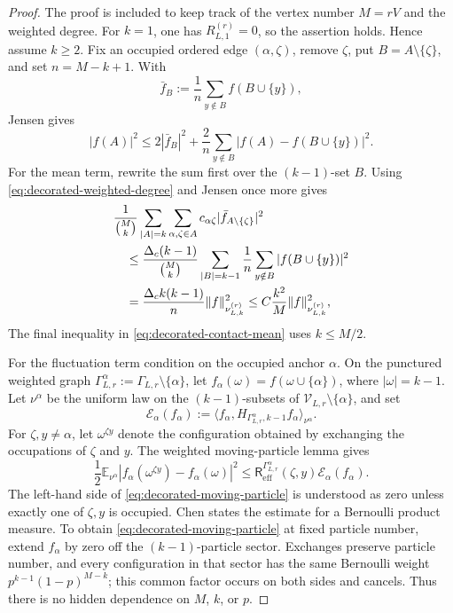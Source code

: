 \documentclass[11pt]{article}
\numberwithin{equation}{section}
\theoremstyle{remark}
\newcommand{\1}{\mathbf 1}
\begin{document}
\begin{proof}
The proof is included to keep track of the vertex number \(M=rV\) and the
weighted degree.  For \(k=1\), one has \(R_{L,1}^{(r)}=0\), so the assertion
holds.  Hence assume \(k\geq2\).  Fix an occupied ordered edge
\((\alpha,\zeta)\), remove
\(\zeta\), put \(B=A\setminus\{\zeta\}\), and set
\(n=M-k+1\).  With
\[
 \bar f_B:=\frac1n\sum_{y\notin B}f(B\cup\{y\}),
\]
Jensen gives
\begin{equation}
 |f(A)|^2\leq2|\bar f_B|^2
 +\frac2n\sum_{y\notin B}
 |f(A)-f(B\cup\{y\})|^2.
 \label{eq:decorated-contact-jensen}
\end{equation}
For the mean term, rewrite the sum first over the \((k-1)\)-set \(B\).
Using \eqref{eq:decorated-weighted-degree} and Jensen once more gives
\begin{align}
 &\frac1{\binom Mk}\sum_{|A|=k}
 \sum_{\alpha,\zeta\in A}c_{\alpha\zeta}
 |\bar f_{A\setminus\{\zeta\}}|^2\notag\\
 &\quad\leq
 \frac{\Delta_c(k-1)}{\binom Mk}
 \sum_{|B|=k-1}\frac1n\sum_{y\notin B}|f(B\cup\{y\})|^2\notag\\
 &\quad=
 \frac{\Delta_c k(k-1)}n\|f\|_{\nu_{L,k}^{(r)}}^2
 \leq C\frac{k^2}{M}\|f\|_{\nu_{L,k}^{(r)}}^2,
 \label{eq:decorated-contact-mean}
\end{align}
The final inequality in \eqref{eq:decorated-contact-mean} uses
\(k\leq M/2\).

For the fluctuation term condition on the occupied anchor \(\alpha\).  On
the punctured weighted graph
\(\Gamma_{L,r}^{\alpha}:=\Gamma_{L,r}\setminus\{\alpha\}\), let
\(f_\alpha(\omega)=f(\omega\cup\{\alpha\})\), where
\(|\omega|=k-1\).  Let \(\nu^\alpha\) be the uniform law on the
\((k-1)\)-subsets of
\(\mathcal V_{L,r}\setminus\{\alpha\}\), and set
\[
 \mathcal E_\alpha(f_\alpha):=
 \langle f_\alpha,
 H_{\Gamma_{L,r}^{\alpha},k-1}f_\alpha\rangle_{\nu^\alpha}.
\]
For \(\zeta,y\ne\alpha\), let \(\omega^{\zeta y}\) denote the
configuration obtained by exchanging the occupations of \(\zeta\) and
\(y\).  The weighted moving-particle lemma \cite{Chen2017} gives
\begin{equation}
 \frac12\mathbb E_{\nu^\alpha}
 |f_\alpha(\omega^{\zeta y})-f_\alpha(\omega)|^2
 \leq
 \mathsf R_{\mathrm{eff}}^{\Gamma_{L,r}^{\alpha}}(\zeta,y)
 \mathcal E_\alpha(f_\alpha).
 \label{eq:decorated-moving-particle}
\end{equation}
The left-hand side of \eqref{eq:decorated-moving-particle} is understood as
zero unless exactly one of \(\zeta,y\) is occupied.  Chen states the
estimate for a Bernoulli product measure.  To obtain
\eqref{eq:decorated-moving-particle} at fixed particle number, extend
\(f_\alpha\) by zero off
the \((k-1)\)-particle sector.  Exchanges preserve particle number, and
every configuration in that sector has the same Bernoulli weight
\(p^{k-1}(1-p)^{M-k}\); this common factor occurs on both sides and
cancels.  Thus there is no hidden dependence on \(M\), \(k\), or \(p\).


\end{proof}
\end{document}
